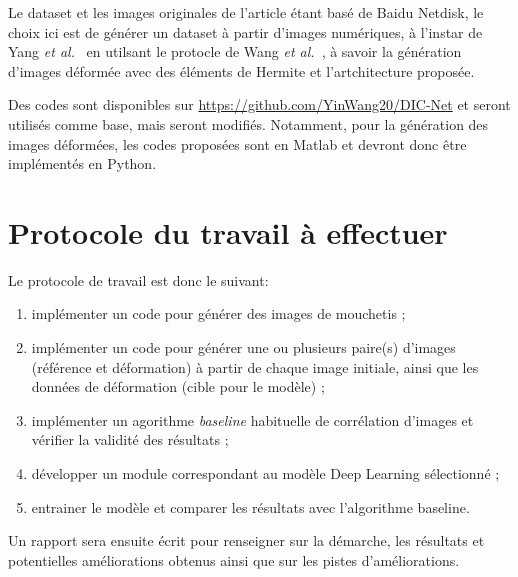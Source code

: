 \documentclass[
	a4paper, %
	10pt, %
	unnumberedsections, %
	twoside, %
]{LTJournalArticle}
\begin{document}
Le dataset et les images originales de l'article \cite{WANG:2023107278} étant basé de Baidu Netdisk, le choix ici est de générer un dataset à partir d'images numériques, à l'instar de Yang \textit{et al.}~\cite{Yang:DeepDic2022} en utilsant le protocle de Wang \textit{et al.}~\cite{WANG:2023107278}, à savoir la génération d'images déformée avec des éléments de Hermite et l'artchitecture proposée.

Des codes sont disponibles sur \url{https://github.com/YinWang20/DIC-Net} et seront utilisés comme base, mais seront modifiés.
Notamment, pour la génération des images déformées, les codes proposées sont en Matlab\textregistered{} et devront donc être implémentés en Python.

\section{Protocole du travail à effectuer}
Le protocole de travail est donc le suivant:
\begin{enumerate}
	\item implémenter un code pour générer des images de mouchetis ;
	\item implémenter un code pour générer une ou plusieurs paire(s) d'images (référence et déformation) à partir de chaque image initiale, ainsi que les données de déformation (cible pour le modèle) ;
	\item implémenter un agorithme \textit{baseline} habituelle de corrélation d'images et vérifier la validité des résultats ;
	\item développer un module correspondant au modèle Deep Learning sélectionné ;
	\item entrainer le modèle et comparer les résultats avec l'algorithme baseline.
\end{enumerate}

Un rapport sera ensuite écrit pour renseigner sur la démarche, les résultats et potentielles améliorations obtenus ainsi que sur les pistes d'améliorations.


\printbibliography %

\end{document}
